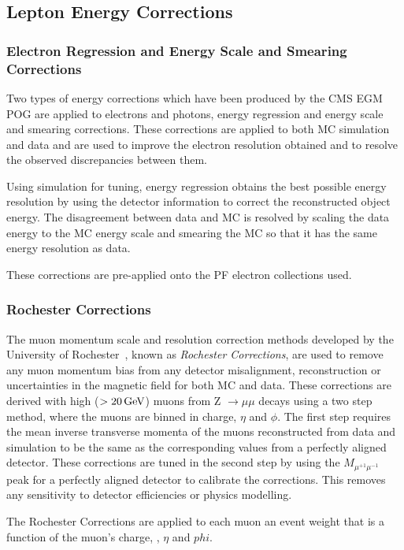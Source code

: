 \subsection{Lepton Energy Corrections}\label{subsec:leptonEnergyCorrections}
\subsubsection{Electron Regression and Energy Scale and Smearing Corrections}
Two types of energy corrections which have been produced by the CMS EGM POG are applied to electrons and photons, energy regression and energy scale and smearing corrections.
These corrections are applied to both MC simulation and data and are used to improve the electron resolution obtained and to resolve the observed discrepancies between them.

Using simulation for tuning, energy regression obtains the best possible energy resolution by using the detector information to correct the reconstructed object energy.
The disagreement between data and MC is resolved by scaling the data energy to the MC energy scale and smearing the MC so that it has the same energy resolution as data. 

These corrections are pre-applied onto the PF electron collections used.

\subsubsection{Rochester Corrections}
The muon momentum scale and resolution correction methods developed by the University of Rochester~\cite{rochester}, known as \emph{Rochester Corrections}, are used to remove any muon momentum bias from any detector misalignment, reconstruction or uncertainties in the magnetic field for both MC and data.
These corrections are derived with high \pt ($> 20\,\text{Ge\hspace{-.08em}V}$) muons from Z $ \rightarrow \mu\mu$ decays using a two step method, where the muons are binned in charge, $\eta$ and $\phi$.
The first step requires the mean inverse transverse momenta of the muons reconstructed from data and simulation to be the same as the corresponding values from a perfectly aligned detector.
These corrections are tuned in the second step by using the $M_{\mu^{+1}\mu^{-1}}$ peak for a perfectly aligned detector to calibrate the corrections.
This removes any sensitivity to detector efficiencies or physics modelling.

The Rochester Corrections are applied to each muon an event weight that is a function of the muon's charge, \pt, $\eta$ and $phi$.

